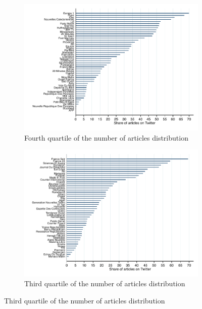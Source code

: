 \clearpage
\pagebreak
\begin{figure}
\begin{center}
\begin{subfigure}{1\textwidth}
 	    \centering
 	    \includegraphics[scale=.6]{figures/fig_mean_Tweeted_fourth_quartile_nb_articles}
 	    \caption{Fourth quartile of the number of articles distribution}
 	    \label{fig:fig_mean_Tweeted_fourth_quartile_nb_articles}
\end{subfigure}
\begin{subfigure}{1\textwidth}
 	    \centering
 	    \includegraphics[scale=.6]{figures/fig_mean_Tweeted_third_quartile_nb_articles}
 	    \caption{Third quartile of the number of articles distribution}

\end{subfigure}
\end{center}
\end{figure}
